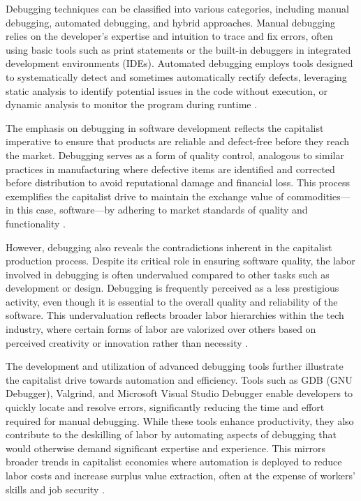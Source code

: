 \begin{refsection}
Debugging techniques can be classified into various categories, including manual debugging, automated debugging, and hybrid approaches. Manual debugging relies on the developer’s expertise and intuition to trace and fix errors, often using basic tools such as print statements or the built-in debuggers in integrated development environments (IDEs). Automated debugging employs tools designed to systematically detect and sometimes automatically rectify defects, leveraging static analysis to identify potential issues in the code without execution, or dynamic analysis to monitor the program during runtime \cite[pp.~67-72]{agans2002debugging}.

The emphasis on debugging in software development reflects the capitalist imperative to ensure that products are reliable and defect-free before they reach the market. Debugging serves as a form of quality control, analogous to similar practices in manufacturing where defective items are identified and corrected before distribution to avoid reputational damage and financial loss. This process exemplifies the capitalist drive to maintain the exchange value of commodities—in this case, software—by adhering to market standards of quality and functionality \cite[pp.~180-185]{fuchs2014digital}.

However, debugging also reveals the contradictions inherent in the capitalist production process. Despite its critical role in ensuring software quality, the labor involved in debugging is often undervalued compared to other tasks such as development or design. Debugging is frequently perceived as a less prestigious activity, even though it is essential to the overall quality and reliability of the software. This undervaluation reflects broader labor hierarchies within the tech industry, where certain forms of labor are valorized over others based on perceived creativity or innovation rather than necessity \cite[pp.~88-92]{braverman1974labor}.

The development and utilization of advanced debugging tools further illustrate the capitalist drive towards automation and efficiency. Tools such as GDB (GNU Debugger), Valgrind, and Microsoft Visual Studio Debugger enable developers to quickly locate and resolve errors, significantly reducing the time and effort required for manual debugging. While these tools enhance productivity, they also contribute to the deskilling of labor by automating aspects of debugging that would otherwise demand significant expertise and experience. This mirrors broader trends in capitalist economies where automation is deployed to reduce labor costs and increase surplus value extraction, often at the expense of workers' skills and job security \cite[pp.~492-497]{marx2008capital}.


\end{refsection}
